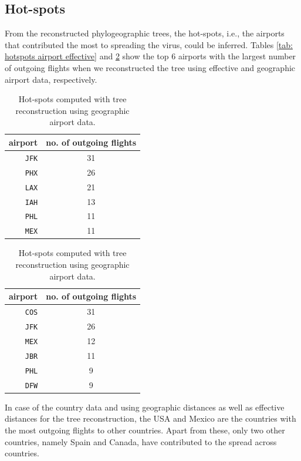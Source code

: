 \documentclass{article}
\begin{document}
\subsection{Hot-spots}
From the reconstructed phylogeographic trees, the hot-spots, i.e., the airports
that contributed the most to spreading the virus, could be inferred. Tables
\ref{tab: hotspots airport effective} and \ref{tab: hotspots airport geographic}
show the top 6 airports with the largest number of outgoing flights when we
reconstructed the tree using effective and geographic airport data,
respectively.

\begin{table}[h!]
\centering
\parbox{.45\linewidth}{
\centering
\begin{tabular}{r|c}
airport & no. of outgoing flights \\
\hline
\texttt{JFK}      & 31                      \\
\texttt{PHX}      & 26                      \\
\texttt{LAX}      & 21                      \\
\texttt{IAH}      & 13                      \\
\texttt{PHL}      & 11                      \\
\texttt{MEX}      & 11                                     
\end{tabular}
\caption{Hot-spots computed with tree reconstruction using effective airport data.}
\label{tab: hotspots airport effective}
}
\qquad
\parbox{.45\linewidth}{
\centering
\begin{tabular}{r|c}
airport & no. of outgoing flights \\
\hline
\texttt{COS}      & 31                      \\
\texttt{JFK}      & 26                      \\
\texttt{MEX}      & 12                      \\
\texttt{JBR}      & 11                      \\
\texttt{PHL}      & 9                       \\
\texttt{DFW}      & 9                                
\end{tabular}
\caption{Hot-spots computed with tree reconstruction using geographic airport data.}
\label{tab: hotspots airport geographic}
}
\end{table}

In case of the country data and using geographic distances as well as effective
distances for the tree reconstruction, the USA and Mexico are the countries with
the most outgoing flights to other countries. Apart from these, only two other
countries, namely Spain and Canada, have contributed to the spread across
countries.
\end{document}
